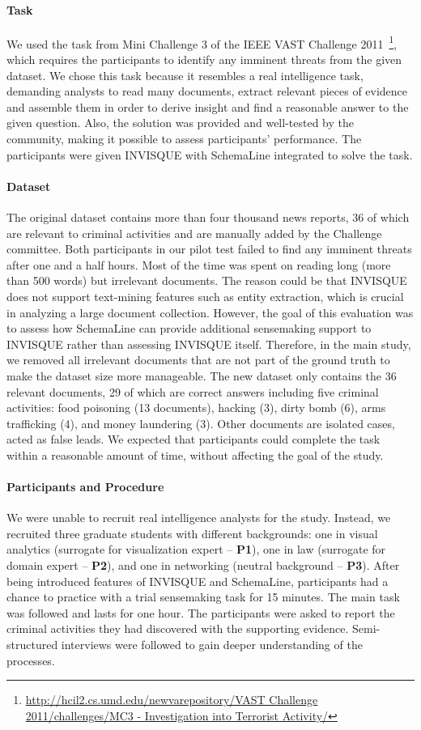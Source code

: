 \paragraph{Task}
We used the task from Mini Challenge 3 of the IEEE VAST Challenge 2011~\footnote{\url{http://hcil2.cs.umd.edu/newvarepository/VAST Challenge 2011/challenges/MC3 - Investigation into Terrorist Activity/}}, which requires the participants to identify any imminent threats from the given dataset. We chose this task because it resembles a real intelligence task, demanding analysts to read many documents, extract relevant pieces of evidence and assemble them in order to derive insight and find a reasonable answer to the given question. Also, the solution was provided and well-tested by the community, making it possible to assess participants' performance. The participants were given INVISQUE with SchemaLine integrated to solve the task. 

\paragraph{Dataset}
The original dataset contains more than four thousand news reports, 36 of which are relevant to criminal activities and are manually added by the Challenge committee. Both participants in our pilot test failed to find any imminent threats after one and a half hours. Most of the time was spent on reading long (more than 500 words) but irrelevant documents. The reason could be that INVISQUE does not support text-mining features such as entity extraction, which is crucial in analyzing a large document collection. However, the goal of this evaluation was to assess how SchemaLine can provide additional sensemaking support to INVISQUE rather than assessing INVISQUE itself. Therefore, in the main study, we removed all irrelevant documents that are not part of the ground truth to make the dataset size more manageable. The new dataset only contains the 36 relevant documents, 29 of which are correct answers including five criminal activities: food poisoning (13 documents), hacking (3), dirty bomb (6), arms trafficking (4), and money laundering (3). Other documents are isolated cases, acted as false leads. We expected that participants could complete the task within a reasonable amount of time, without affecting the goal of the study. 

\paragraph{Participants and Procedure}
We were unable to recruit real intelligence analysts for the study. Instead, we recruited three graduate students with different backgrounds:  one in visual analytics (surrogate for visualization expert -- \textbf{P1}), one in law (surrogate for domain expert -- \textbf{P2}), and one in networking (neutral background -- \textbf{P3}). After being introduced features of INVISQUE and SchemaLine, participants had a chance to practice with a trial sensemaking task for 15 minutes. The main task was followed and lasts for one hour. The participants were asked to report the criminal activities they had discovered with the supporting evidence. Semi-structured interviews were followed to gain deeper understanding of the processes.

